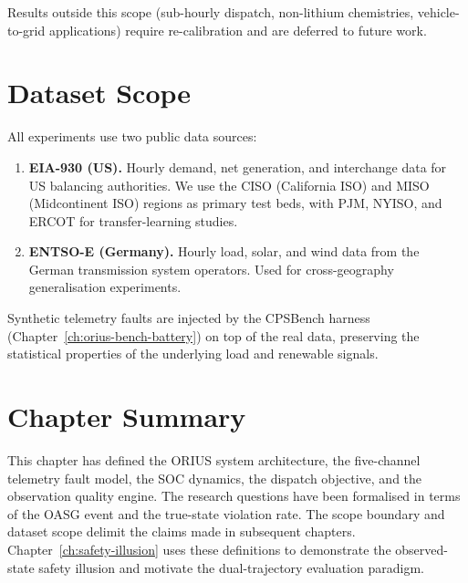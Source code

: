 Results outside this scope (sub-hourly dispatch, non-lithium chemistries,
vehicle-to-grid applications) require re-calibration and are deferred to
future work.

\section{Dataset Scope}
\label{sec:dataset-scope}

All experiments use two public data sources:

\begin{enumerate}
  \item \textbf{EIA-930 (US).}  Hourly demand, net generation, and
    interchange data for US balancing authorities.  We use the CISO
    (California ISO) and MISO (Midcontinent ISO) regions as primary test
    beds, with PJM, NYISO, and ERCOT for transfer-learning studies.
  \item \textbf{ENTSO-E (Germany).}  Hourly load, solar, and wind data
    from the German transmission system operators.  Used for
    cross-geography generalisation experiments.
\end{enumerate}

Synthetic telemetry faults are injected by the CPSBench harness
(Chapter~\ref{ch:orius-bench-battery}) on top of the real data,
preserving the statistical properties of the underlying load and renewable
signals.

\section{Chapter Summary}

This chapter has defined the ORIUS system architecture, the
five-channel telemetry fault model, the SOC dynamics, the dispatch
objective, and the observation quality engine.  The research questions
have been formalised in terms of the OASG event and the true-state
violation rate.  The scope boundary and dataset scope delimit the claims
made in subsequent chapters.  Chapter~\ref{ch:safety-illusion} uses these
definitions to demonstrate the observed-state safety illusion and motivate
the dual-trajectory evaluation paradigm.
